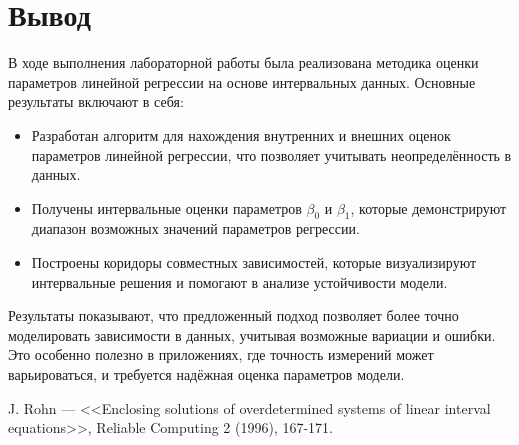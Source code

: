 \documentclass{article}
\begin{document}
  \section{Вывод}

  В ходе выполнения лабораторной работы была реализована методика оценки
  параметров линейной регрессии на основе интервальных данных. Основные
  результаты включают в себя:

  \begin{itemize}
    \item Разработан алгоритм для нахождения внутренних и внешних оценок
      параметров линейной регрессии, что позволяет учитывать
      неопределённость в данных.
    \item Получены интервальные оценки параметров \( \beta_0 \) и
      \( \beta_1 \), которые демонстрируют диапазон возможных значений
      параметров регрессии.
    \item Построены коридоры совместных зависимостей, которые
      визуализируют интервальные решения и помогают в анализе устойчивости
      модели.
  \end{itemize}

  Результаты показывают, что предложенный подход позволяет более точно
  моделировать зависимости в данных, учитывая возможные вариации и ошибки.
  Это особенно полезно в приложениях, где точность измерений может
  варьироваться, и требуется надёжная оценка параметров модели.

  
  

  \begin{thebibliography}{9}
     J. Rohn --- <<Enclosing solutions of overdetermined systems of linear interval equations>>, Reliable Computing 2 (1996), 167-171.
  \end{thebibliography}
\end{document}

